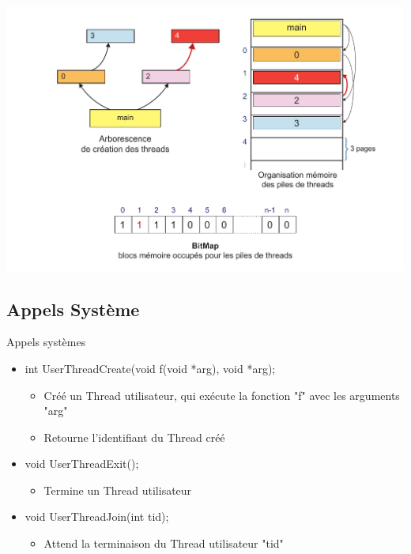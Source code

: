 \documentclass{beamer}
\begin{document}
\begin{frame}
  	\begin{center}
	  	\includegraphics[scale=0.27]{images/FS5.png}
  	\end{center}
\end{frame}


\subsection{Appels Système}
\begin{frame}
	\begin{block}{Appels systèmes}
		\begin{itemize}
			\item<1-> int UserThreadCreate(void f(void *arg), void *arg);
			\begin{itemize}
				\item<1-> Créé un Thread utilisateur, qui exécute la fonction "f" avec les arguments "arg"
				\item<1-> Retourne l'identifiant du Thread créé
			\end{itemize}
			\item<2-> void UserThreadExit();
			\begin{itemize}
				\item<1-> Termine un Thread utilisateur
			\end{itemize}
			\item<3-> void UserThreadJoin(int tid);
			\begin{itemize}
				\item<1-> Attend la terminaison du Thread utilisateur "tid"
			\end{itemize}
		\end{itemize}
	\end{block}
\end{frame}
\end{document}
